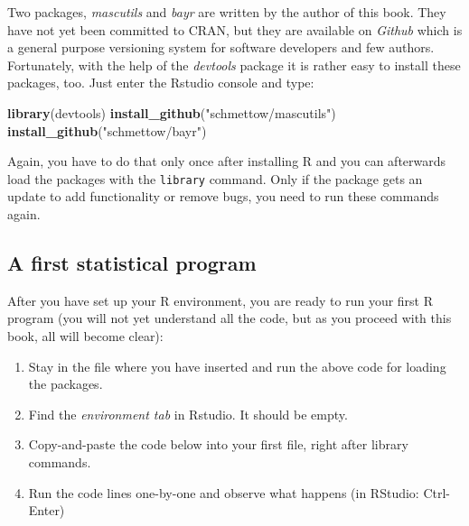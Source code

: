\documentclass[]{svmono}
\newenvironment{Shaded}{\begin{snugshade}}{\end{snugshade}}
\newcommand{\KeywordTok}[1]{\textcolor[rgb]{0.13,0.29,0.53}{\textbf{#1}}}
\newcommand{\StringTok}[1]{\textcolor[rgb]{0.31,0.60,0.02}{#1}}
\newcommand{\NormalTok}[1]{#1}
\providecommand{\tightlist}{%
  \setlength{\itemsep}{0pt}\setlength{\parskip}{0pt}}
\theoremstyle{definition}
\theoremstyle{definition}
\theoremstyle{definition}
\theoremstyle{remark}
\begin{document}
Two packages, \emph{mascutils} and \emph{bayr} are written by the author
of this book. They have not yet been committed to CRAN, but they are
available on \emph{Github} which is a general purpose versioning system
for software developers and few authors. Fortunately, with the help of
the \emph{devtools} package it is rather easy to install these packages,
too. Just enter the Rstudio console and type:

\begin{Shaded}
\begin{Highlighting}[]
\KeywordTok{library}\NormalTok{(devtools)}
\KeywordTok{install_github}\NormalTok{(}\StringTok{"schmettow/mascutils"}\NormalTok{)}
\KeywordTok{install_github}\NormalTok{(}\StringTok{"schmettow/bayr"}\NormalTok{)}
\end{Highlighting}
\end{Shaded}

Again, you have to do that only once after installing R and you can
afterwards load the packages with the \texttt{library} command. Only if
the package gets an update to add functionality or remove bugs, you need
to run these commands again.

\subsection{A first statistical program}\label{first_program}

After you have set up your R environment, you are ready to run your
first R program (you will not yet understand all the code, but as you
proceed with this book, all will become clear):

\begin{enumerate}
\def\labelenumi{\arabic{enumi}.}
\tightlist
\item
  Stay in the file where you have inserted and run the above code for
  loading the packages.
\item
  Find the \emph{environment tab} in Rstudio. It should be empty.
\item
  Copy-and-paste the code below into your first file, right after
  library commands.
\item
  Run the code lines one-by-one and observe what happens (in RStudio:
  Ctrl-Enter)
\end{enumerate}
\end{document}

